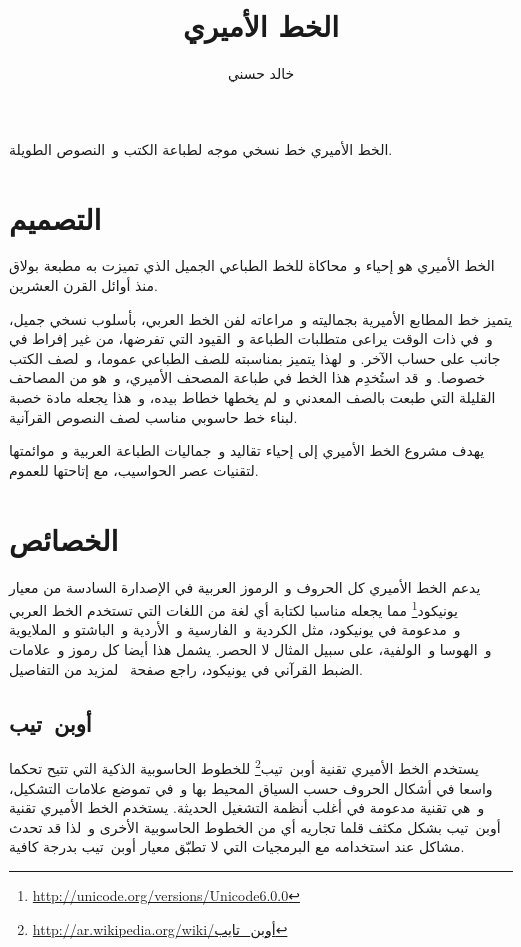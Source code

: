 \documentclass{article}
\title{الخط الأميري}
\author{خالد حسني}
\begin{document}
\maketitle


الخط الأميري خط نسخي موجه لطباعة الكتب و النصوص الطويلة.

\section{التصميم}
الخط الأميري هو إحياء و محاكاة للخط الطباعي الجميل الذي تميزت به مطبعة
بولاق منذ أوائل القرن العشرين.

يتميز خط المطابع الأميرية بجماليته و مراعاته لفن الخط العربي، بأسلوب
نسخي جميل، و في ذات الوقت يراعى متطلبات الطباعة و القيود التي تفرضها، من
غير إفراط في جانب على حساب الآخر. و لهذا يتميز بمناسبته للصف الطباعي
عموما، و لصف الكتب خصوصا. و قد استُخدِم هذا الخط في طباعة المصحف
الأميري، و هو من المصاحف القليلة التي طبعت بالصف المعدني و لم يخطها خطاط
بيده، و هذا يجعله مادة خصبة لبناء خط حاسوبي مناسب لصف النصوص القرآنية.

يهدف مشروع الخط الأميري إلى إحياء تقاليد و جماليات الطباعة العربية
و موائمتها لتقنيات عصر الحواسيب، مع إتاحتها للعموم.

\section{الخصائص}
يدعم الخط الأميري كل الحروف و الرموز العربية في الإصدارة السادسة من
معيار يونيكود\footnote{\url{http://unicode.org/versions/Unicode6.0.0}}
مما يجعله مناسبا لكتابة أي لغة من اللغات التي تستخدم الخط العربي
و مدعومة في يونيكود، مثل الكردية و الفارسية و الأردية و الباشتو
و الملايوية و الهوسا و الولفية، على سبيل المثال لا الحصر. يشمل هذا أيضا
كل رموز و علامات الضبط القرآني في يونيكود، راجع
صفحة \pageref{ref:quranic-text} لمزيد من التفاصيل.

\subsection{أوبن تيب}
يستخدم الخط الأميري تقنية
أوبن تيب\footnote{\url{http://ar.wikipedia.org/wiki/أوبن_تايب}} للخطوط
الحاسوبية الذكية التي تتيح تحكما واسعا في أشكال الحروف حسب السياق المحيط
بها و في تموضع علامات التشكيل، و هي تقنية مدعومة في أغلب أنظمة التشغيل
الحديثة. يستخدم الخط الأميري تقنية أوبن تيب بشكل مكثف قلما تجاريه أي من
الخطوط الحاسوبية الأخرى و لذا قد تحدث مشاكل عند استخدامه مع البرمجيات
التي لا تطبّق معيار أوبن تيب بدرجة كافية.
\end{document}
